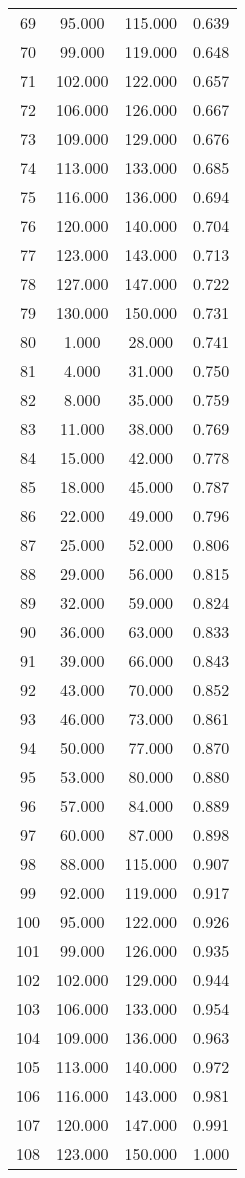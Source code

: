 \begin{tabular}{cccc}
  69 & 95.000 & 115.000 & 0.639 \\ 
  70 & 99.000 & 119.000 & 0.648 \\ 
  71 & 102.000 & 122.000 & 0.657 \\ 
  72 & 106.000 & 126.000 & 0.667 \\ 
  73 & 109.000 & 129.000 & 0.676 \\ 
  74 & 113.000 & 133.000 & 0.685 \\ 
  75 & 116.000 & 136.000 & 0.694 \\ 
  76 & 120.000 & 140.000 & 0.704 \\ 
  77 & 123.000 & 143.000 & 0.713 \\ 
  78 & 127.000 & 147.000 & 0.722 \\ 
  79 & 130.000 & 150.000 & 0.731 \\ 
  80 & 1.000 & 28.000 & 0.741 \\ 
  81 & 4.000 & 31.000 & 0.750 \\ 
  82 & 8.000 & 35.000 & 0.759 \\ 
  83 & 11.000 & 38.000 & 0.769 \\ 
  84 & 15.000 & 42.000 & 0.778 \\ 
  85 & 18.000 & 45.000 & 0.787 \\ 
  86 & 22.000 & 49.000 & 0.796 \\ 
  87 & 25.000 & 52.000 & 0.806 \\ 
  88 & 29.000 & 56.000 & 0.815 \\ 
  89 & 32.000 & 59.000 & 0.824 \\ 
  90 & 36.000 & 63.000 & 0.833 \\ 
  91 & 39.000 & 66.000 & 0.843 \\ 
  92 & 43.000 & 70.000 & 0.852 \\ 
  93 & 46.000 & 73.000 & 0.861 \\ 
  94 & 50.000 & 77.000 & 0.870 \\ 
  95 & 53.000 & 80.000 & 0.880 \\ 
  96 & 57.000 & 84.000 & 0.889 \\ 
  97 & 60.000 & 87.000 & 0.898 \\ 
  98 & 88.000 & 115.000 & 0.907 \\ 
  99 & 92.000 & 119.000 & 0.917 \\ 
  100 & 95.000 & 122.000 & 0.926 \\ 
  101 & 99.000 & 126.000 & 0.935 \\ 
  102 & 102.000 & 129.000 & 0.944 \\ 
  103 & 106.000 & 133.000 & 0.954 \\ 
  104 & 109.000 & 136.000 & 0.963 \\ 
  105 & 113.000 & 140.000 & 0.972 \\ 
  106 & 116.000 & 143.000 & 0.981 \\ 
  107 & 120.000 & 147.000 & 0.991 \\ 
  108 & 123.000 & 150.000 & 1.000 \\ 
   \hline
\end{tabular}
